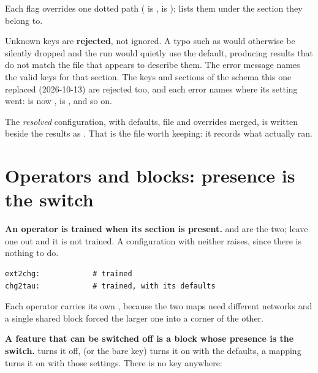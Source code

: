 Each flag overrides one dotted path ( is ,  is );  lists them under the section they belong to.

\begin{pnote}
Unknown keys are \textbf{rejected}, not ignored. A typo such as  would otherwise be silently dropped and the run would quietly use the default, producing results that do not match the file that appears to describe them. The error message names the valid keys for that section. The keys and sections of the schema this one replaced (2026-10-13) are rejected too, and each error names where its setting went:  is now ,  is , and so on.
\end{pnote}

The \emph{resolved} configuration, with defaults, file and overrides merged, is written beside the results as . That is the file worth keeping: it records what actually ran.

\section{Operators and blocks: presence is the switch}

\label{sec:enableblocks}

\textbf{An operator is trained when its section is present.}  and  are the two; leave one out and it is not trained. A configuration with neither raises, since there is nothing to do.

\begin{lstlisting}
ext2chg:            # trained
chg2tau:            # trained, with its defaults
\end{lstlisting}

Each operator carries its own , because the two maps need different networks and a single shared block forced the larger one into a corner of the other.

\textbf{A feature that can be switched off is a block whose presence is the switch.}  turns it off,  (or the bare key) turns it on with the defaults, a mapping turns it on with those settings. There is no  key anywhere:

